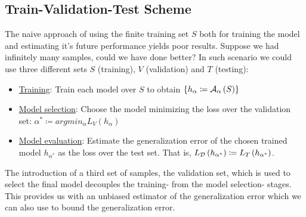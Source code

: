 \subsection{Train-Validation-Test Scheme}
The naive approach of using the finite training set $S$ both for training the model and estimating it's future performance yields poor results. Suppose we had infinitely many samples, could we have done better? In such scenario we could use three different sets $S$ (training), $V$ (validation) and $T$ (testing):
\begin{itemize}
	\item\underline{Training}: Train each model over $S$ to obtain $\left\{h_\alpha\coloneqq \mathcal{A}_\alpha\left(S\right)\right\}$
	\item\underline{Model selection}: Choose the model minimizing the loss over the validation set: $\alpha^*\coloneqq argmin_\alpha L_V\left(h_\alpha\right)$
	\item\underline{Model evaluation}: Estimate the generalization error of the chosen trained model $h_{\alpha^*}$ as the loss over the test set. That is, $L_{\mathcal{D}}\left(h_{\alpha^*}\right)\coloneqq L_T\left(h_{\alpha^*}\right)$.
\end{itemize}

The introduction of a third set of samples, the validation set, which is used to select the final model decouples the training- from the model selection- stages. This provides us with an unbiased estimator of the generalization error which we can also use to bound the generalization error.

